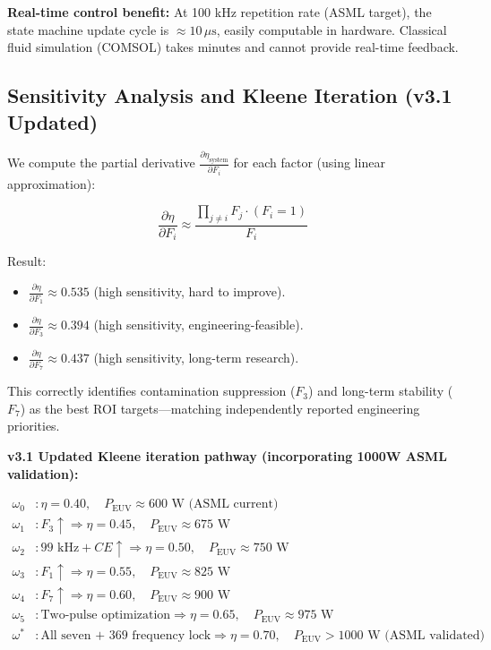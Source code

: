 \documentclass[twocolumn]{article}
\begin{document}
\textbf{Real-time control benefit:} At 100 kHz repetition rate (ASML target), the state machine update cycle is $\approx 10\,\mu\text{s}$, easily computable in hardware. Classical fluid simulation (COMSOL) takes minutes and cannot provide real-time feedback.

\subsection{Sensitivity Analysis and Kleene Iteration (v3.1 Updated)}

We compute the partial derivative $\frac{\partial \eta_{\text{system}}}{\partial F_i}$ for each factor (using linear approximation):

\[
\frac{\partial \eta}{\partial F_i} \approx \frac{\prod_{j \neq i} F_j \cdot (F_i = 1)}{F_i}
\]

Result:
\begin{itemize}
  \item $\frac{\partial \eta}{\partial F_1} \approx 0.535$ (high sensitivity, hard to improve).
  \item $\frac{\partial \eta}{\partial F_3} \approx 0.394$ (high sensitivity, engineering-feasible).
  \item $\frac{\partial \eta}{\partial F_7} \approx 0.437$ (high sensitivity, long-term research).
\end{itemize}

This correctly identifies contamination suppression ($F_3$) and long-term stability ($F_7$) as the best ROI targets—matching independently reported engineering priorities.

\textbf{v3.1 Updated Kleene iteration pathway (incorporating 1000W ASML validation):}

\begin{align}
\omega_0 &: \eta = 0.40, \quad P_{\text{EUV}} \approx 600\text{ W (ASML current)} \\
\omega_1 &: F_3 \uparrow \Rightarrow \eta = 0.45, \quad P_{\text{EUV}} \approx 675\text{ W} \\
\omega_2 &: 99\text{ kHz} + CE \uparrow \Rightarrow \eta = 0.50, \quad P_{\text{EUV}} \approx 750\text{ W} \\
\omega_3 &: F_1 \uparrow \Rightarrow \eta = 0.55, \quad P_{\text{EUV}} \approx 825\text{ W} \\
\omega_4 &: F_7 \uparrow \Rightarrow \eta = 0.60, \quad P_{\text{EUV}} \approx 900\text{ W} \\
\omega_5 &: \text{Two-pulse optimization} \Rightarrow \eta = 0.65, \quad P_{\text{EUV}} \approx 975\text{ W} \\
\omega^* &: \text{All seven + 369 frequency lock} \Rightarrow \eta = 0.70, \quad P_{\text{EUV}} > 1000\text{ W (ASML validated)}
\end{align}
\end{document}
